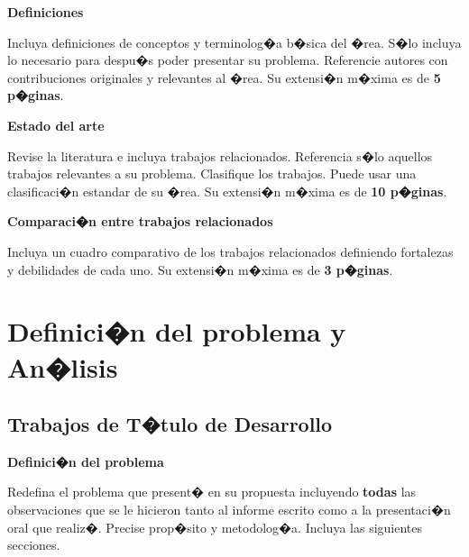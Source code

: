 \documentclass[12pt,a4paper]{article}
\begin{document}
\large{\textbf{Definiciones}}

\vspace{1mm}

\normalsize

Incluya definiciones de conceptos y terminolog�a b�sica del �rea.
S�lo incluya lo necesario para despu�s poder presentar su problema.
Referencie autores con contribuciones originales y relevantes al
�rea. Su extensi�n m�xima es de \textbf{5 p�ginas}.

\vspace{2mm}

\large{\textbf{Estado del arte}}

\vspace{1mm}

\normalsize

Revise la literatura e incluya trabajos relacionados. Referencia
s�lo aquellos trabajos relevantes a su problema. Clasifique los
trabajos. Puede usar una clasificaci�n estandar de su �rea. Su
extensi�n m�xima es de \textbf{10 p�ginas}.

\vspace{2mm}

\large{\textbf{Comparaci�n entre trabajos relacionados}}

\vspace{1mm}

\normalsize

Incluya un cuadro comparativo de los trabajos relacionados
definiendo fortalezas y debilidades de cada uno. Su extensi�n m�xima
es de \textbf{3 p�ginas}.

\vspace{3mm}
\normalsize
\section{Definici�n del problema y An�lisis}
\subsection{Trabajos de T�tulo de Desarrollo}

\label{definicion}
\large{\textbf{Definici�n del problema}} \label{prob}

\vspace{1mm}

\normalsize

Redefina el problema que present� en su propuesta incluyendo
\textbf{todas} las observaciones que se le hicieron tanto al informe
escrito como a la presentaci�n oral que realiz�. Precise prop�sito y
metodolog�a. Incluya las siguientes secciones.
\end{document}
